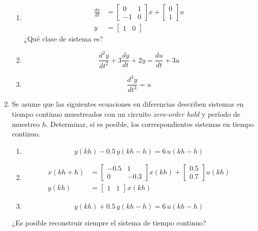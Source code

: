\documentclass[a4paper,12pt]{article}
\begin{document}
\begin{enumerate}
\begin{enumerate}
		      \item \begin{align*}
			            \frac{dx}{dt} & = \begin{bmatrix}
				                              0 & 1 \\ -1 & 0
			                              \end{bmatrix} x + \begin{bmatrix} 0\\1 \end{bmatrix} u \\
			            y             & = \begin{bmatrix}1 & 0 \end{bmatrix}
		            \end{align*}
		            ¿Qué clase de sistema es?
		      \item \[ \frac{d^2y}{dt^2} + 3 \frac{dy}{dt}+2y = \frac{du}{dt}+3u \]
		      \item \[ \frac{d^3y}{dt^3} = u \]
	      \end{enumerate}
	\item Se asume que las siguientes ecuaciones en diferencias describen sistemas en tiempo continuo muestreados con un circuito \textit{zero-order hold} y período de muestreo $h$.
	      Determinar, si es posible, los correspondientes sistemas en tiempo continuo.

	      \begin{enumerate}
		      \item
		            \[
			            y(kh) - 0.5\,y(kh-h) = 6\,u(kh-h)
		            \]

		      \item
		            \begin{align*}
			            x(kh+h) & =\begin{bmatrix}-0.5 & 1    \\0    & -0.3\end{bmatrix}x(kh)+\begin{bmatrix}0.5 \\0.7\end{bmatrix}u(kh) \\
			            y(kh)   & =\begin{bmatrix}1 & 1\end{bmatrix}x(kh)
		            \end{align*}

		      \item
		            \[
			            y(kh) + 0.5\,y(kh-h) = 6\,u(kh-h)
		            \]
	      \end{enumerate}
	      ¿Es posible reconstruir siempre el sistema de tiempo continuo?


\end{enumerate}
\end{document}
